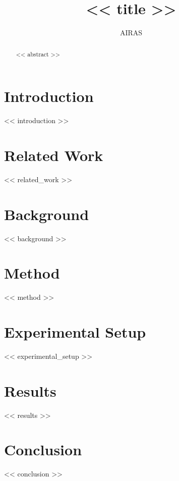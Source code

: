 \documentclass{article}
\title{<< title >>}
\author{AIRAS}
\begin{document}
\maketitle

\begin{abstract}
<< abstract >>
\end{abstract}

\section{Introduction}
<< introduction >>

\section{Related Work}
<< related_work >>

\section{Background}
<< background >>

\section{Method}
<< method >>

\section{Experimental Setup}
<< experimental_setup >>

\section{Results}
<< results >>

\section{Conclusion}
<< conclusion >>




\end{document}
